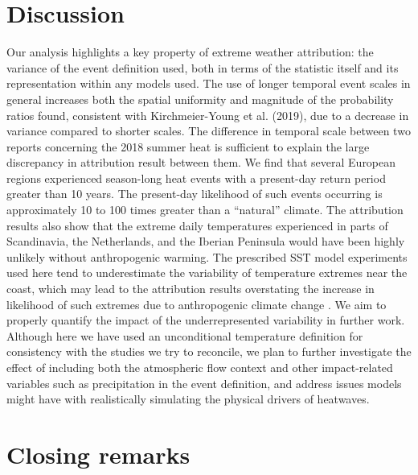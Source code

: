 \section{Discussion}

  Our analysis highlights a key property of extreme weather attribution: the variance of the event definition used, both in terms of the statistic itself and its representation within any models used. The use of longer temporal event scales in general increases both the spatial uniformity and magnitude of the probability ratios found, consistent with Kirchmeier-Young et al. (2019), due to a decrease in variance compared to shorter scales. The difference in temporal scale between two reports concerning the 2018 summer heat is sufficient to explain the large discrepancy in attribution result between them. We find that several European regions experienced season-long heat events with a present-day return period greater than 10 years. The present-day likelihood of such events occurring is approximately 10 to 100 times greater than a “natural” climate. The attribution results also show that the extreme daily temperatures experienced in parts of Scandinavia, the Netherlands, and the Iberian Peninsula would have been highly unlikely without anthropogenic warming. The prescribed SST model experiments used here tend to underestimate the variability of temperature extremes near the coast, which may lead to the attribution results overstating the increase in likelihood of such extremes due to anthropogenic climate change \citep{bellprat_towards_2019}. We aim to properly quantify the impact of the underrepresented variability in further work. Although here we have used an unconditional temperature definition for consistency with the studies we try to reconcile, we plan to further investigate the effect of including both the atmospheric flow context and other impact-related variables such as precipitation in the event definition, and address issues models might have with realistically simulating the physical drivers of heatwaves.

\section{Closing remarks}
